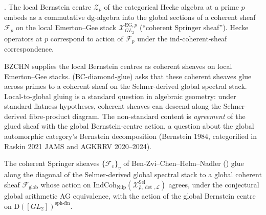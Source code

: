 \begin{theorem}
\label{v4-arith:acd:thm:BZCHN}
\ClaimStatusProvedElsewhere. The local Bernstein centre
\(\mathcal{Z}_{p}\) of the categorical Hecke algebra at a prime \(p\)
embeds as a commutative dg-algebra into the global sections of a
coherent sheaf \(\mathcal{F}_{p}\) on the local Emerton--Gee stack
\(\mathcal{X}^{\mathrm{EG},p}_{GL_{2}}\) (``coherent Springer
sheaf''). Hecke operators at \(p\) correspond to action of
\(\mathcal{F}_{p}\) under the ind-coherent-sheaf correspondence.
\end{theorem}

\begin{remark}
\label{v4-arith:acd:rem:BZCHN-supplies}
BZCHN supplies the local Bernstein centres as coherent sheaves on
local Emerton--Gee stacks. (BC-diamond-glue) asks that these
coherent sheaves glue across primes to a coherent sheaf on the
Selmer-derived global spectral stack. Local-to-global gluing is a standard
question in algebraic geometry: under standard flatness hypotheses,
coherent sheaves can descend along the Selmer-derived fibre-product
diagram. The non-standard content is \emph{agreement} of the
glued sheaf with the global Bernstein-centre action, a question
about the global automorphic category's Bernstein decomposition
(Bernstein 1984, categorified in Raskin 2021 JAMS and AGKRRV
2020--2024).
\end{remark}

\begin{conjecture}
\label{v4-arith:acd:cj:bc-diamond-glue-concrete}
The coherent Springer sheaves \(\{\mathcal{F}_{v}\}_{v}\) of
Ben-Zvi--Chen--Helm--Nadler () glue
along the diagonal of the Selmer-derived global spectral stack to a global
coherent sheaf \(\mathcal{F}_{\mathrm{glob}}\) whose action on
\(\mathrm{IndCoh}_{\mathrm{Nilp}}(\mathcal{X}^{\mathrm{Sel}}_{\bar\rho,\det,\mathcal{L}})\)
agrees, under the conjectural global arithmetic AG equivalence, with
the action of the global Bernstein centre on
\(\mathrm{D}([GL_{2}])^{\mathrm{sph\text{-}fin}}\).
\end{conjecture}

